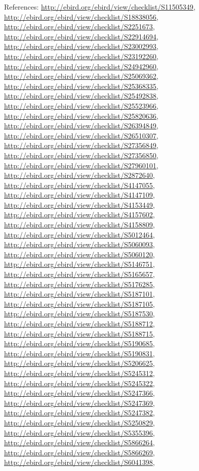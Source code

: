 \documentclass[9pt, article]{memoir}
\begin{document}
\begin{multicols}{2}
References: 
\url{http://ebird.org/ebird/view/checklist/S11505349}, 
\url{http://ebird.org/ebird/view/checklist/S18838056}, 
\url{http://ebird.org/ebird/view/checklist/S2251673}, 
\url{http://ebird.org/ebird/view/checklist/S22914694}, 
\url{http://ebird.org/ebird/view/checklist/S23002993}, 
\url{http://ebird.org/ebird/view/checklist/S23192260}, 
\url{http://ebird.org/ebird/view/checklist/S24942960}, 
\url{http://ebird.org/ebird/view/checklist/S25069362}, 
\url{http://ebird.org/ebird/view/checklist/S25368335}, 
\url{http://ebird.org/ebird/view/checklist/S25492838}, 
\url{http://ebird.org/ebird/view/checklist/S25523966}, 
\url{http://ebird.org/ebird/view/checklist/S25820636}, 
\url{http://ebird.org/ebird/view/checklist/S26394849}, 
\url{http://ebird.org/ebird/view/checklist/S26510307}, 
\url{http://ebird.org/ebird/view/checklist/S27356849}, 
\url{http://ebird.org/ebird/view/checklist/S27356850}, 
\url{http://ebird.org/ebird/view/checklist/S27960101}, 
\url{http://ebird.org/ebird/view/checklist/S2872640}, 
\url{http://ebird.org/ebird/view/checklist/S4147055}, 
\url{http://ebird.org/ebird/view/checklist/S4147109}, 
\url{http://ebird.org/ebird/view/checklist/S4153449}, 
\url{http://ebird.org/ebird/view/checklist/S4157602}, 
\url{http://ebird.org/ebird/view/checklist/S4158809}, 
\url{http://ebird.org/ebird/view/checklist/S5012464}, 
\url{http://ebird.org/ebird/view/checklist/S5060093}, 
\url{http://ebird.org/ebird/view/checklist/S5060120}, 
\url{http://ebird.org/ebird/view/checklist/S5146751}, 
\url{http://ebird.org/ebird/view/checklist/S5165657}, 
\url{http://ebird.org/ebird/view/checklist/S5176285}, 
\url{http://ebird.org/ebird/view/checklist/S5187101}, 
\url{http://ebird.org/ebird/view/checklist/S5187105}, 
\url{http://ebird.org/ebird/view/checklist/S5187530}, 
\url{http://ebird.org/ebird/view/checklist/S5188712}, 
\url{http://ebird.org/ebird/view/checklist/S5188715}, 
\url{http://ebird.org/ebird/view/checklist/S5190685}, 
\url{http://ebird.org/ebird/view/checklist/S5190831}, 
\url{http://ebird.org/ebird/view/checklist/S5206625}, 
\url{http://ebird.org/ebird/view/checklist/S5245312}, 
\url{http://ebird.org/ebird/view/checklist/S5245322}, 
\url{http://ebird.org/ebird/view/checklist/S5247366}, 
\url{http://ebird.org/ebird/view/checklist/S5247369}, 
\url{http://ebird.org/ebird/view/checklist/S5247382}, 
\url{http://ebird.org/ebird/view/checklist/S5250829}, 
\url{http://ebird.org/ebird/view/checklist/S5355396}, 
\url{http://ebird.org/ebird/view/checklist/S5866264}, 
\url{http://ebird.org/ebird/view/checklist/S5866269}, 
\url{http://ebird.org/ebird/view/checklist/S6041398}, 

\end{multicols}
\end{document}
